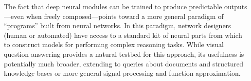 \documentclass[10pt,twocolumn,letterpaper]{article}
\begin{document}
The fact that deep neural modules can be trained to produce predictable
outputs---even when freely composed---points toward a more general paradigm of
``programs'' built from neural networks. In this paradigm, network designers
(human or automated) have access to a standard kit of neural parts from which to
construct models for performing complex reasoning tasks. While visual question
answering provides a natural testbed for this approach, its usefulness is
potentially much broader, extending to queries about documents and structured
knowledge bases or more general signal processing and function approximation.

{\small


}
\end{document}
